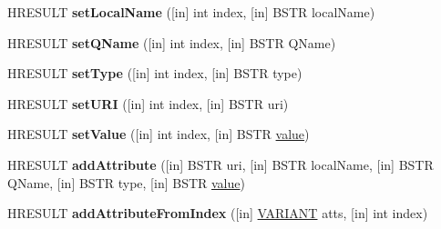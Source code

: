 \begin{DoxyCompactItemize}
\mbox{\label{interface_m_s_x_m_l2_1_1_i_m_x_attributes_a6d57f29035968575fa6230429fc587ab}} 
H\+R\+E\+S\+U\+LT {\bfseries set\+Local\+Name} (\mbox{[}in\mbox{]} int index, \mbox{[}in\mbox{]} B\+S\+TR local\+Name)
\item 
\mbox{\label{interface_m_s_x_m_l2_1_1_i_m_x_attributes_a232d41e67270e99da873bc3f833eeecd}} 
H\+R\+E\+S\+U\+LT {\bfseries set\+Q\+Name} (\mbox{[}in\mbox{]} int index, \mbox{[}in\mbox{]} B\+S\+TR Q\+Name)
\item 
\mbox{\label{interface_m_s_x_m_l2_1_1_i_m_x_attributes_af1da4296dc2d6d00330a4c93ad6a3c26}} 
H\+R\+E\+S\+U\+LT {\bfseries set\+Type} (\mbox{[}in\mbox{]} int index, \mbox{[}in\mbox{]} B\+S\+TR type)
\item 
\mbox{\label{interface_m_s_x_m_l2_1_1_i_m_x_attributes_a41517821f9ec6fa527e76a20104fbba2}} 
H\+R\+E\+S\+U\+LT {\bfseries set\+U\+RI} (\mbox{[}in\mbox{]} int index, \mbox{[}in\mbox{]} B\+S\+TR uri)
\item 
\mbox{\label{interface_m_s_x_m_l2_1_1_i_m_x_attributes_a8d4f99767c5717b8113784cba73859b2}} 
H\+R\+E\+S\+U\+LT {\bfseries set\+Value} (\mbox{[}in\mbox{]} int index, \mbox{[}in\mbox{]} B\+S\+TR \hyperlink{unionvalue}{value})
\item 
\mbox{\label{interface_m_s_x_m_l2_1_1_i_m_x_attributes_a33924685cb6af8f67741e1d91ac93afa}} 
H\+R\+E\+S\+U\+LT {\bfseries add\+Attribute} (\mbox{[}in\mbox{]} B\+S\+TR uri, \mbox{[}in\mbox{]} B\+S\+TR local\+Name, \mbox{[}in\mbox{]} B\+S\+TR Q\+Name, \mbox{[}in\mbox{]} B\+S\+TR type, \mbox{[}in\mbox{]} B\+S\+TR \hyperlink{unionvalue}{value})
\item 
\mbox{\label{interface_m_s_x_m_l2_1_1_i_m_x_attributes_a7c4547f45667272260fbc1542b3d2043}} 
H\+R\+E\+S\+U\+LT {\bfseries add\+Attribute\+From\+Index} (\mbox{[}in\mbox{]} \hyperlink{structtag_v_a_r_i_a_n_t}{V\+A\+R\+I\+A\+NT} atts, \mbox{[}in\mbox{]} int index)
\item 
\mbox{\label{interface_m_s_x_m_l2_1_1_i_m_x_attributes_a95baeb45ff73dc3b3ac10605aaaa4b2a}} 

\end{DoxyCompactItemize}

